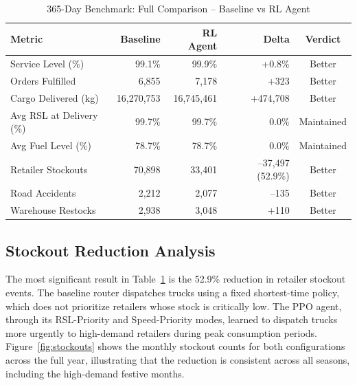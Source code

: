 \begin{table}[h!]
\centering
\caption{365-Day Benchmark: Full Comparison -- Baseline vs RL Agent}
\label{tab:comparison}
\begin{tabular}{|l|r|r|r|c|}
\hline
\textbf{Metric} & \textbf{Baseline} & \textbf{RL Agent} & \textbf{Delta} & \textbf{Verdict} \\
\hline
Service Level (\%)          & 99.1\%        & 99.9\%        & +0.8\%           & Better    \\
\hline
Orders Fulfilled            & 6,855         & 7,178         & +323             & Better    \\
\hline
Cargo Delivered (kg)        & 16,270,753    & 16,745,461    & +474,708         & Better    \\
\hline
Avg RSL at Delivery (\%)    & 99.7\%        & 99.7\%        & 0.0\%            & Maintained \\
\hline
Avg Fuel Level (\%)         & 78.7\%        & 78.7\%        & 0.0\%            & Maintained \\
\hline
Retailer Stockouts          & 70,898        & 33,401        & --37,497 (52.9\%)& Better    \\
\hline
Road Accidents              & 2,212         & 2,077         & --135            & Better    \\
\hline
Warehouse Restocks          & 2,938         & 3,048         & +110             & Better    \\
\hline
\end{tabular}
\end{table}

\subsection{Stockout Reduction Analysis}

The most significant result in Table~\ref{tab:comparison} is the 52.9\% reduction
in retailer stockout events. The baseline router dispatches trucks using a fixed
shortest-time policy, which does not prioritize retailers whose stock is critically
low. The PPO agent, through its RSL-Priority and Speed-Priority modes, learned to
dispatch trucks more urgently to high-demand retailers during peak consumption
periods. Figure~\ref{fig:stockouts} shows the monthly stockout counts for both
configurations across the full year, illustrating that the reduction is consistent
across all seasons, including the high-demand festive months.


